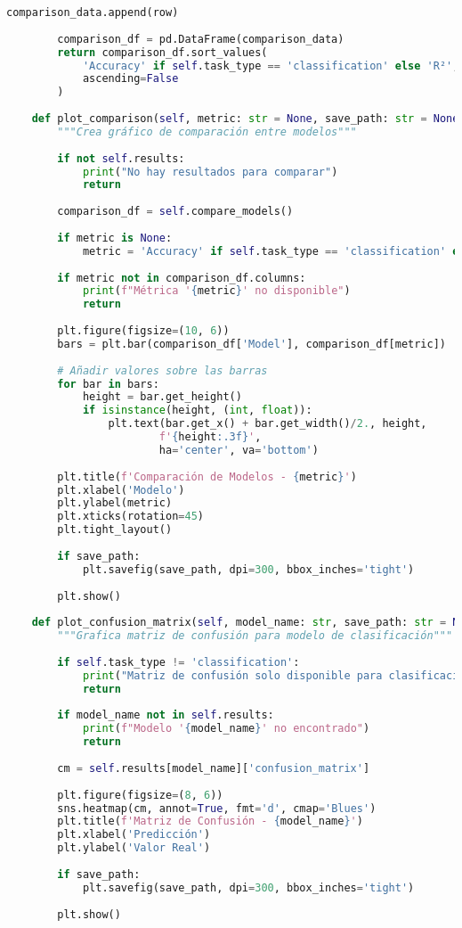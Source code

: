 \begin{lstlisting}[language=Python, caption=Sistema completo de evaluación]
            comparison_data.append(row)
        
        comparison_df = pd.DataFrame(comparison_data)
        return comparison_df.sort_values(
            'Accuracy' if self.task_type == 'classification' else 'R²', 
            ascending=False
        )
    
    def plot_comparison(self, metric: str = None, save_path: str = None):
        """Crea gráfico de comparación entre modelos"""
        
        if not self.results:
            print("No hay resultados para comparar")
            return
        
        comparison_df = self.compare_models()
        
        if metric is None:
            metric = 'Accuracy' if self.task_type == 'classification' else 'R²'
        
        if metric not in comparison_df.columns:
            print(f"Métrica '{metric}' no disponible")
            return
        
        plt.figure(figsize=(10, 6))
        bars = plt.bar(comparison_df['Model'], comparison_df[metric])
        
        # Añadir valores sobre las barras
        for bar in bars:
            height = bar.get_height()
            if isinstance(height, (int, float)):
                plt.text(bar.get_x() + bar.get_width()/2., height,
                        f'{height:.3f}',
                        ha='center', va='bottom')
        
        plt.title(f'Comparación de Modelos - {metric}')
        plt.xlabel('Modelo')
        plt.ylabel(metric)
        plt.xticks(rotation=45)
        plt.tight_layout()
        
        if save_path:
            plt.savefig(save_path, dpi=300, bbox_inches='tight')
        
        plt.show()
    
    def plot_confusion_matrix(self, model_name: str, save_path: str = None):
        """Grafica matriz de confusión para modelo de clasificación"""
        
        if self.task_type != 'classification':
            print("Matriz de confusión solo disponible para clasificación")
            return
        
        if model_name not in self.results:
            print(f"Modelo '{model_name}' no encontrado")
            return
        
        cm = self.results[model_name]['confusion_matrix']
        
        plt.figure(figsize=(8, 6))
        sns.heatmap(cm, annot=True, fmt='d', cmap='Blues')
        plt.title(f'Matriz de Confusión - {model_name}')
        plt.xlabel('Predicción')
        plt.ylabel('Valor Real')
        
        if save_path:
            plt.savefig(save_path, dpi=300, bbox_inches='tight')
        
        plt.show()
\end{lstlisting}

